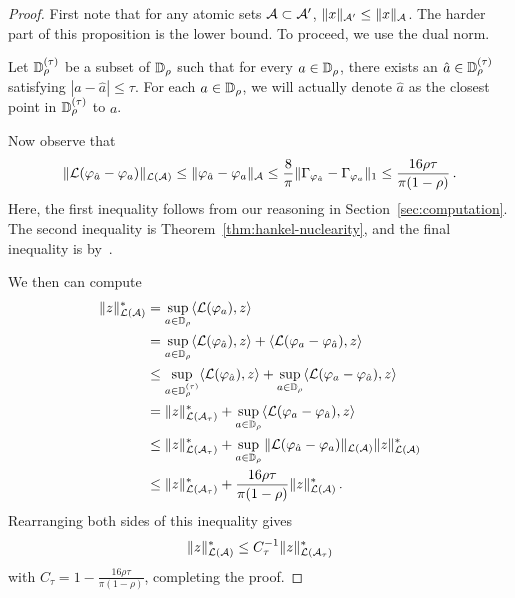 \begin{proof}\label{pf:prop-grid}
First note that for any atomic sets $\mathcal{A} \subset \mathcal{A}'$, $\|x\|_{\mathcal{A}'} \leq \|x\|_{\mathcal{A}}$.  The harder part of this proposition is the lower bound.  To proceed, we use the dual norm. 

Let $\mathbb{D}_\rho^{(\tau)}$ be a subset of $\mathbb{D}_\rho$ such that for every $a \in \mathbb{D}_\rho$, there exists an $\hat{a}\in \mathbb{D}_\rho^{(\tau)}$ satisfying $|a-\hat{a}|\leq \tau$.  For each $a \in \mathbb{D}_\rho$, we will actually denote $\hat{a}$ as the closest point in $\mathbb{D}_\rho^{(\tau)}$ to $a$.

Now observe that 
\begin{align*}
	  \| \mathcal{L}(\varphi_{\hat{a}}-\varphi_a)\|_{\mathcal{L}(\mathcal{A})} \leq  \| \varphi_{\hat{a}}-\varphi_a\|_{\mathcal{A}}
	  \leq \frac{8}{\pi} \|\Gamma_{\varphi_{\hat{a}}}- \Gamma_{\varphi_a}\|_1 \leq \frac{16 \rho \tau}{\pi (1-\rho)}\,.
\end{align*}
Here, the first inequality follows from our reasoning in Section~\ref{sec:computation}.  The second inequality is Theorem~\ref{thm:hankel-nuclearity}, and the final inequality is by~.

We then can compute
\begin{align*}
\|z\|_{\mathcal{L}(\mathcal{A})}^* &= \sup_{a \in \mathbb{D}_\rho} \langle \mathcal{L}(\varphi_a),z \rangle\\
&= \sup_{a \in \mathbb{D}_\rho} \langle \mathcal{L}(\varphi_{\hat{a}}), z \rangle + \langle \mathcal{L}(\varphi_{a}-\varphi_{\hat{a}}), z\rangle \\
&\leq\sup_{a \in \mathbb{D}_\rho^{(\tau)}} \langle \mathcal{L}(\varphi_{\hat{a}}), z \rangle +\sup_{a \in \mathbb{D}_\rho}\langle \mathcal{L}(\varphi_a-\varphi_{\hat{a}}), z\rangle \\
&= \|z\|_{\mathcal{L}(\mathcal{A}_\tau)}^*+ \sup_{a \in \mathbb{D}_\rho}\langle \mathcal{L}(\varphi_a-\varphi_{\hat{a}}), z\rangle \\
&\leq \|z\|_{\mathcal{L}(\mathcal{A}_\tau)}^*+ \sup_{a \in \mathbb{D}_\rho}  \| \mathcal{L}(\varphi_{\hat{a}}-\varphi_a)\|_{\mathcal{L}(\mathcal{A})} \|z\|_{\mathcal{L}(\mathcal{A})}^*\\
&\leq \|z\|_{\mathcal{L}(\mathcal{A}_\tau)}^*+ \frac{16\rho\tau}{\pi(1-\rho)} \|z\|_{\mathcal{L}(\mathcal{A})}^*\,.
\end{align*}
Rearranging both sides of this inequality gives
\[
	\|z\|_{\mathcal{L}(\mathcal{A})}^* \leq C_\tau^{-1} \|z\|_{\mathcal{L}(\mathcal{A}_\tau)}^*
\]
with $C_\tau =  1-\tfrac{16\rho\tau}{\pi(1-\rho)}$, completing the proof.
\end{proof}

